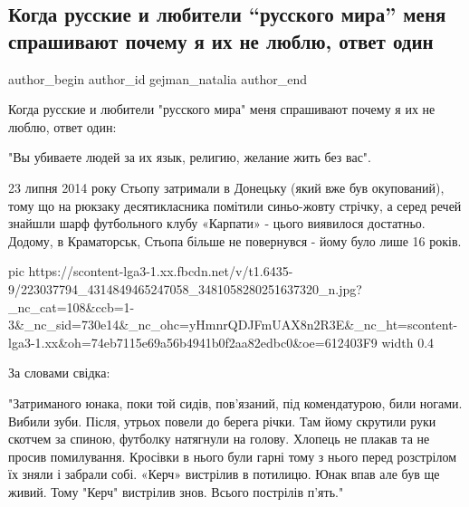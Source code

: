  
 
 
 
 
 
\subsection{Когда русские и любители \enquote{русского мира} меня спрашивают почему я их не люблю, ответ один}
\label{sec:26_07_2021.fb.gejman_natalia.1.rusmir}
 
\ifcmt
 author_begin
   author_id gejman_natalia
 author_end
\fi

Когда русские и любители "русского мира" меня спрашивают почему я их не люблю,
ответ один: 

"Вы убиваете людей за их язык, религию, желание жить без вас". 

23 липня 2014 року Стьопу затримали в Донецьку (який вже був окупований), тому
що на рюкзаку десятикласника помітили синьо-жовту стрічку, а серед речей
знайшли шарф футбольного клубу «Карпати» - цього виявилося достатньо. Додому, в
Краматорськ, Стьопа більше не повернувся - йому було лише 16 років.

\ifcmt
  pic https://scontent-lga3-1.xx.fbcdn.net/v/t1.6435-9/223037794_4314849465247058_3481058280251637320_n.jpg?_nc_cat=108&ccb=1-3&_nc_sid=730e14&_nc_ohc=yHmnrQDJFmUAX8n2R3E&_nc_ht=scontent-lga3-1.xx&oh=74eb7115e69a56b4941b0f2aa82edbc0&oe=612403F9
  width 0.4
\fi

За словами свідка:

"Затриманого юнака, поки той сидів, пов'язаний, під комендатурою, били ногами.
Вибили зуби. Після, утрьох повели до берега річки. Там йому скрутили руки
скотчем за спиною, футболку натягнули на голову. Хлопець не плакав та не просив
помилування. Кросівки в нього були гарні тому з нього перед розстрілом їх зняли
і забрали собі. «Керч» вистрілив в потилицю. Юнак впав але був ще живий. Тому
"Керч" вистрілив знов. Всього пострілів п'ять."

